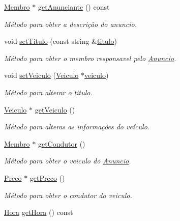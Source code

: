 \begin{DoxyCompactItemize}
\hyperlink{class_membro}{Membro} $\ast$ \hyperlink{class_anuncio_a35c4c8b294b3bdda618a6a0708bf4647}{get\+Anunciante} () const 
\begin{DoxyCompactList}\small\item\em Método para obter a descrição do anuncio. \end{DoxyCompactList}\item 
void \hyperlink{class_anuncio_af95db56a1347160ef1cf53ea1ec659a6}{set\+Titulo} (const string \&\hyperlink{class_anuncio_adb34bedd8220f42b9ee37662c21313e6}{titulo})
\begin{DoxyCompactList}\small\item\em Método para obter o membro responsavel pelo \hyperlink{class_anuncio}{Anuncio}. \end{DoxyCompactList}\item 
void \hyperlink{class_anuncio_acf4d8a46abfa73a073f7df39b2601e17}{set\+Veiculo} (\hyperlink{class_veiculo}{Veiculo} $\ast$\hyperlink{class_anuncio_a3cffe1ce2024500bddaf07bd0f7ecc81}{veiculo})
\begin{DoxyCompactList}\small\item\em Método para alterar o titulo. \end{DoxyCompactList}\item 
\hyperlink{class_veiculo}{Veiculo} $\ast$ \hyperlink{class_anuncio_ae68f4b30d497dbccf1e3ab5f83b140da}{get\+Veiculo} ()
\begin{DoxyCompactList}\small\item\em Método para alteras as informações do veículo. \end{DoxyCompactList}\item 
\hyperlink{class_membro}{Membro} $\ast$ \hyperlink{class_anuncio_a6344f8ce7de909f6841429ac14b97b7a}{get\+Condutor} ()
\begin{DoxyCompactList}\small\item\em Método para obter o veiculo do \hyperlink{class_anuncio}{Anuncio}. \end{DoxyCompactList}\item 
\hyperlink{class_preco}{Preco} $\ast$ \hyperlink{class_anuncio_a566dfb63e64851909367d5136963670d}{get\+Preco} ()
\begin{DoxyCompactList}\small\item\em Método para obter o condutor do veiculo. \end{DoxyCompactList}\item 
\hyperlink{class_hora}{Hora} \hyperlink{class_anuncio_a8850dd9d778dfe5ea92268f654d7b563}{get\+Hora} () const 

\end{DoxyCompactItemize}
